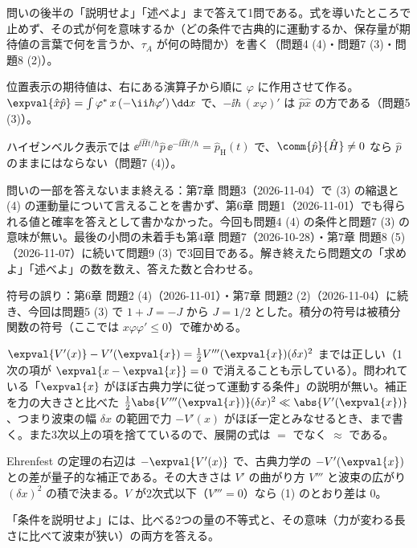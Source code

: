 \begin{daiji}
  \item 問いの後半の「説明せよ」「述べよ」まで答えて1問である。式を導いたところで止めず、その式が何を意味するか（どの条件で古典的に運動するか、保存量が期待値の言葉で何を言うか、$\tau_{A}$ が何の時間か）を書く（問題4 (4)・問題7 (3)・問題8 (2)）。
  \item 位置表示の期待値は、右にある演算子から順に $\varphi$ に作用させて作る。$\expval{\hat{x}\hat{p}}=\int\varphi^{*}\,x\,(-\ii\hbar\varphi')\,\dd x$ で、$-\ii\hbar\,(x\varphi)'$ は $\hat{p}\hat{x}$ の方である（問題5 (3)）。
  \item ハイゼンベルク表示では $\ee^{\ii\hat{H}t/\hbar}\hat{p}\,\ee^{-\ii\hat{H}t/\hbar}=\hat{p}_{\mathrm{H}}(t)$ で、$\comm{\hat{p}}{\hat{H}}\neq0$ なら $\hat{p}$ のままにはならない（問題7 (4)）。
\end{daiji}
\begin{maemo}
  \item 問いの一部を答えないまま終える：第7章 問題3（2026-11-04）で (3) の縮退と (4) の運動量について言えることを書かず、第6章 問題1（2026-11-01）でも得られる値と確率を答えとして書かなかった。今回も問題4 (4) の条件と問題7 (3) の意味が無い。最後の小問の未着手も第4章 問題7（2026-10-28）・第7章 問題8 (5)（2026-11-07）に続いて問題9 (3) で3回目である。解き終えたら問題文の「求めよ」「述べよ」の数を数え、答えた数と合わせる。
  \item 符号の誤り：第6章 問題2 (4)（2026-11-01）・第7章 問題2 (2)（2026-11-04）に続き、今回は問題5 (3) で $1+J=-J$ から $J=1/2$ とした。積分の符号は被積分関数の符号（ここでは $x\varphi\varphi'\le0$）で確かめる。
\end{maemo}
\begin{kotaeran}
   $\expval{V'(x)}-V'(\expval{x})=\frac{1}{2}V'''(\expval{x})(\delta x)^{2}$ までは正しい（1次の項が $\expval{x-\expval{x}}=0$ で消えることも示している）。問われている「$\expval{x}$ がほぼ古典力学に従って運動する条件」の説明が無い。補正を力の大きさと比べた $\frac{1}{2}\abs{V'''(\expval{x})}(\delta x)^{2}\ll\abs{V'(\expval{x})}$、つまり波束の幅 $\delta x$ の範囲で力 $-V'(x)$ がほぼ一定とみなせるとき、まで書く。また3次以上の項を捨てているので、展開の式は $=$ でなく $\approx$ である。
\end{kotaeran}
\begin{rikai}
  \item Ehrenfest の定理の右辺は $-\expval{V'(x)}$ で、古典力学の $-V'(\expval{x})$ との差が量子的な補正である。その大きさは $V'$ の曲がり方 $V'''$ と波束の広がり $(\delta x)^{2}$ の積で決まる。$V$ が2次式以下（$V'''=0$）なら (1) のとおり差は $0$。
  \item 「条件を説明せよ」には、比べる2つの量の不等式と、その意味（力が変わる長さに比べて波束が狭い）の両方を答える。
\end{rikai}
